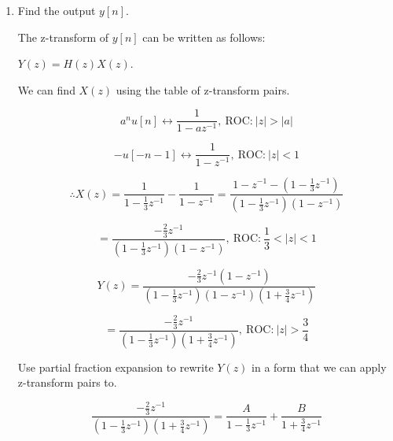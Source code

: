 \documentclass[fleqn]{article}
\begin{document}
\begin{enumerate}[nolistsep]
\begin{enumerate}[nolistsep]
			\item Find the output $y[n]$.
				
				The z-transform of $y[n]$ can be written as follows:
				
				$Y(z) = H(z)X(z)$.
				
				We can find $X(z)$ using the table of z-transform pairs.
				
				\begin{equation*}
					a^nu[n] \leftrightarrow \frac{1}{1 - az^{-1}},\ \text{ROC:}\ |z| > |a| 
				\end{equation*}
			
				\begin{equation*}
					-u[-n-1] \leftrightarrow \frac{1}{1 - z^{-1}},\ \text{ROC:}\ |z| < 1 
				\end{equation*}
				
				\begin{equation*}
					\therefore X(z) = \frac{1}{1 - \frac{1}{3}z^{-1}} - \frac{1}{1 - z^{-1}} = \frac{1 - z^{-1} - \left(1 - \frac{1}{3}z^{-1}\right)}{\left(1 - \frac{1}{3}z^{-1}\right)\left(1 - z^{-1}\right)}
				\end{equation*}
				
				\begin{equation*}
					= \frac{-\frac{2}{3}z^{-1}}{\left(1 - \frac{1}{3}z^{-1}\right)\left(1 - z^{-1}\right)},\ \text{ROC:}\ \frac{1}{3} < |z| < 1 
				\end{equation*}
				
				\begin{equation*}
					Y(z) = \frac{-\frac{2}{3}z^{-1}(1 - z^{-1})}{\left(1 - \frac{1}{3}z^{-1}\right)\left(1 - z^{-1}\right)\left(1 + \frac{3}{4}z^{-1}\right)}
				\end{equation*}
				
				\begin{equation*}
					= \frac{-\frac{2}{3}z^{-1}}{\left(1 - \frac{1}{3}z^{-1}\right)\left(1 + \frac{3}{4}z^{-1}\right)},\ \text{ROC:}\ |z| > \frac{3}{4} 
				\end{equation*}
				
				Use partial fraction expansion to rewrite $Y(z)$ in a form that we can apply z-transform pairs to.
				
				\begin{equation*}
					\frac{-\frac{2}{3}z^{-1}}{\left(1 - \frac{1}{3}z^{-1}\right)\left(1 + \frac{3}{4}z^{-1}\right)} = \frac{A}{1 - \frac{1}{3}z^{-1}} + \frac{B}{1 + \frac{3}{4}z^{-1}}
				\end{equation*}
				

\end{enumerate}
\end{enumerate}
\end{document}
